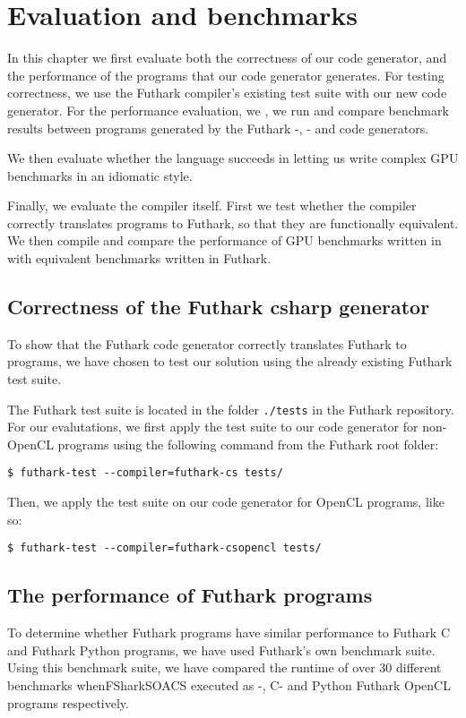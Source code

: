 \chapter{Evaluation and benchmarks}
In this chapter we first evaluate both the correctness of our code generator,
and the performance of the \csharp{} programs that our code generator generates.
For testing correctness, we use the Futhark compiler's existing test suite with
our new code generator. For the performance evaluation, we , we run and compare benchmark
results between programs generated by the Futhark \csharp{}-, \C{}- and \Python{} code generators.

We then evaluate whether the \fshark{} language succeeds in letting us write
complex GPU benchmarks in an idiomatic \fsharp{} style.

Finally, we evaluate the \fshark{} compiler itself. First we test whether the
\fshark{} compiler correctly translates \fshark{} programs to Futhark, so that
they are functionally equivalent.
We then compile and compare the performance of GPU benchmarks written in
\fshark{} with equivalent benchmarks written in Futhark.


\section{Correctness of the Futhark csharp{} generator}
\label{subsec:futharkcsharpcorrectness}
To show that the Futhark \csharp{} code generator correctly translates Futhark
to \csharp{} programs, we have chosen to test our solution using the already existing Futhark test
suite.

The Futhark test suite is located in the folder \texttt{./tests} in the Futhark
repository. For our evalutations, we first apply the test suite to our \csharp{}
code generator for non-OpenCL programs using the following command from the
Futhark root folder:

\begin{verbatim}
$ futhark-test --compiler=futhark-cs tests/
\end{verbatim}

Then, we apply the test suite on our code generator for \csharp{} OpenCL
programs, like so:

\begin{verbatim}
$ futhark-test --compiler=futhark-csopencl tests/
\end{verbatim}



\section{The performance of Futhark \csharp{} programs}
\label{subsec:futharkcsharpperformance}
To determine whether Futhark \csharp{} programs have similar performance to
Futhark C and Futhark Python programs, we have used Futhark's own benchmark
suite.
Using this benchmark suite, we have compared the runtime of over 30 different
benchmarks whenFSharkSOACS executed as \csharp{}-, C- and Python Futhark OpenCL programs
respectively.

